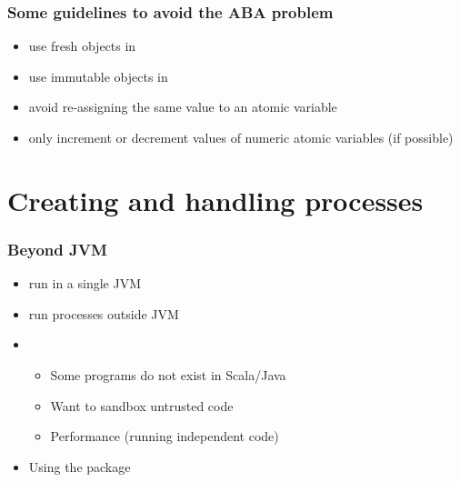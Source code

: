 \documentclass[aspectratio=169]{beamer}
\begin{document}
\begin{frame}\frametitle{Some guidelines to avoid the ABA problem}
  \begin{itemize}
    \item use fresh objects in 
    \item use immutable objects in 
    \item avoid re-assigning the same value to an atomic variable
    \item only increment or decrement values of numeric atomic variables (if possible)
  \end{itemize}


\end{frame}


\section{Creating and handling processes} %

\begin{frame}\frametitle{Beyond JVM}

\begin{itemize}
  \item {} run in a single JVM
  \item {} run processes outside JVM
  \item {}
  \pause
    \begin{itemize}
      \item Some programs do not exist in Scala/Java
      \item \pause Want to sandbox untrusted code
      \item \pause Performance (running independent code)
    \end{itemize}
  \pause
  \item Using the \alert{} package
\end{itemize}
\end{frame}
\end{document}
